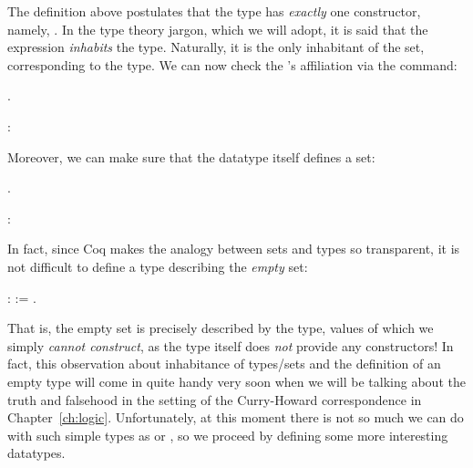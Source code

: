 The definition above postulates that the type  has \textit{exactly} one
constructor, namely, . In the type theory jargon, which we will
adopt, it is said that the expression  \textit{inhabits} the 
type. Naturally, it is the only inhabitant of the set, corresponding
to the  type. We can now check the 's affiliation via the
 command:


\begin{coqdoccode}
\coqdocemptyline
\coqdocnoindent
{} .\coqdoceol
\coqdocemptyline
\end{coqdoccode}
\coqdoceol
\coqdocemptyline
\coqdocnoindent
{}\coqdoceol
\coqdocindent{2.50em}
: 

\coqdocemptyline


Moreover, we can make sure that the  datatype itself defines a set:
\begin{coqdoccode}
\coqdocemptyline
\coqdocnoindent
{} .\coqdoceol
\coqdocemptyline
\end{coqdoccode}
\coqdoceol
\coqdocemptyline
\coqdocnoindent
{}\coqdoceol
\coqdocindent{2.50em}
: 

\coqdocemptyline


In fact, since Coq makes the analogy between sets and types so
transparent, it is not difficult to define a type describing the
\textit{empty} set:


\begin{coqdoccode}
\coqdocemptyline
\coqdocnoindent
{}  :  := .\coqdoceol
\coqdocemptyline
\end{coqdoccode}


That is, the empty set is precisely described by the type, values of
which we simply \textit{cannot construct}, as the type itself does \textit{not}
provide any constructors!  In fact, this observation about inhabitance
of types/sets and the definition of an empty type will come in quite
handy very soon when we will be talking about the truth and falsehood
in the setting of the Curry-Howard correspondence in
Chapter~\ref{ch:logic}. Unfortunately, at this moment there is not
so much we can do with such simple types as  or , so we
proceed by defining some more interesting datatypes.


